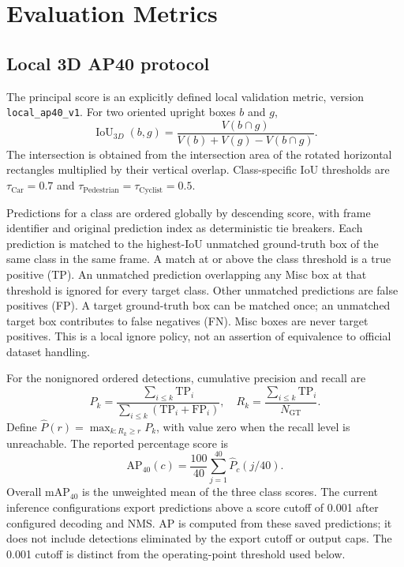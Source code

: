 \documentclass[10pt,twocolumn]{article}
\newcommand{\ap}{\mathrm{AP}_{40}}
\newcommand{\map}{\mathrm{mAP}_{40}}
\begin{document}
\section{Evaluation Metrics}
\label{sec:metrics}
\subsection{Local 3D AP40 protocol}
The principal score is an explicitly defined local validation metric, version \texttt{local\_ap40\_v1}. For two oriented upright boxes $b$ and $g$,
\begin{equation}
\operatorname{IoU}_{3D}(b,g)=\frac{V(b\cap g)}{V(b)+V(g)-V(b\cap g)}.
\end{equation}
The intersection is obtained from the intersection area of the rotated horizontal rectangles multiplied by their vertical overlap. Class-specific IoU thresholds are $\tau_{\mathrm{Car}}=0.7$ and $\tau_{\mathrm{Pedestrian}}=\tau_{\mathrm{Cyclist}}=0.5$.

Predictions for a class are ordered globally by descending score, with frame identifier and original prediction index as deterministic tie breakers. Each prediction is matched to the highest-IoU unmatched ground-truth box of the same class in the same frame. A match at or above the class threshold is a true positive (TP). An unmatched prediction overlapping any Misc box at that threshold is ignored for every target class. Other unmatched predictions are false positives (FP). A target ground-truth box can be matched once; an unmatched target box contributes to false negatives (FN). Misc boxes are never target positives. This is a local ignore policy, not an assertion of equivalence to official dataset handling.

For the nonignored ordered detections, cumulative precision and recall are
\begin{equation}
P_k=\frac{\sum_{i\leq k}\mathrm{TP}_i}{\sum_{i\leq k}(\mathrm{TP}_i+\mathrm{FP}_i)},\quad R_k=\frac{\sum_{i\leq k}\mathrm{TP}_i}{N_{\mathrm{GT}}}.
\end{equation}
Define $\widehat P(r)=\max_{k:R_k\geq r}P_k$, with value zero when the recall level is unreachable. The reported percentage score is
\begin{equation}
\ap(c)=\frac{100}{40}\sum_{j=1}^{40}\widehat P_c(j/40).
\label{eq:ap}
\end{equation}
Overall $\map$ is the unweighted mean of the three class scores. The current inference configurations export predictions above a score cutoff of 0.001 after configured decoding and NMS. AP is computed from these saved predictions; it does not include detections eliminated by the export cutoff or output caps. The 0.001 cutoff is distinct from the operating-point threshold used below.
\end{document}
